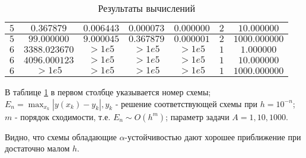 \documentclass[14pt,a4paper]{extarticle}
\newcommand{\1}{\mathbbm{1}}
\begin{document}
\begin{table}[h!]
\begin{center}
\begin{tabular}{|c|c|c|c|c|c|c|}
     $5$ &  $0.367879$ & $0.006443$ & $0.000073$ & $0.000000$ & $2$ & $10.000000$ \\ \hline 
    
     $5$ &  $99.000000$ & $9.000045$ & $0.367879$ & $0.000001$ & $2$ & $1000.000000$ \\ \hline 
    
     $6$ &  $3388.023670$ & $>1e5$ & $>1e5$ & $>1e5$ & $1$ & $1.000000$ \\ \hline 
    
     $6$ &  $4096.000123$ & $>1e5$ & $>1e5$ & $>1e5$ & $1$ & $10.000000$ \\ \hline 
    
     $6$ &  $>1e5$ & $>1e5$ & $>1e5$ & $>1e5$ & $1$ & $1000.000000$ \\ \hline 
    \end{tabular} 
    \end{center}\caption{Результаты вычислений}  
    \label{Aggreg1CU} \end{table} 
          

    В таблице \ref{Aggreg1CU} в первом столбце указывается номер схемы;
    $E_n=\max _{x_k}\left|y\left(x_k\right)-y_k\right|, y_k$ 
    - решение соответствующей схемы при $h=10^{-n}$; $m$ - порядок сходимости, т.е. $E_n \sim O\left(h^m\right)$;
    параметр задачи $A=1,10,1000$. 
    \par
    Видно, что схемы обладающие $\alpha$-устойчивостью дают хорошее приближение при достаточно малом $h$. 
     
     
\end{document}
